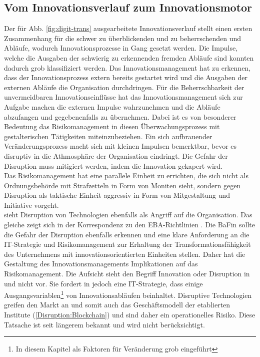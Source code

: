 \subsection{Vom Innovationsverlauf zum Innovationsmotor}
Der für Abb. \ref{fig:digit-trans} ausgearbeitete Innovationsverlauf stellt einen ersten Zusammenhang für die schwer zu überblickenden und zu beherrschenden und Abläufe, wodurch Innovationsprozesse in Gang gesetzt werden. Die Impulse, welche die Ausgaben der schwierig zu erkennenden fremden Abläufe sind konnten dadurch grob klassifiziert werden. Das Innovationsmanagement hat zu erkennen, dass der Innovationsprozess extern bereits gestartet wird und die Ausgaben der externen Abläufe die Organisation durchdringen. Für die Beherrschbarkeit der unvermeidbaren Innovationseinflüsse hat das Innovationsmanagement sich zur Aufgabe machen die externen Impulse wahrzunehmen und die Abläufe abzufangen und gegebenenfalls zu übernehmen.
Dabei ist es von besonderer Bedeutung das Risikomanagement in diesen Überwachungsprozess mit gestalterischen Tätigkeiten miteinzubeziehen. Ein sich aufbrauender Veränderungsprozess macht sich mit kleinen Impulsen bemerktbar, bevor es disruptiv in die Athmosphäre der Organisation eindringt. Die Gefahr der Disruption muss mitigiert werden, indem die Innovation gekapert wird. 
\medskip
\\
Das Risikomanagement hat eine parallele Einheit zu errichten, die sich nicht als Ordnungsbehörde mit Strafzetteln in Form von Moniten sieht, sondern gegen Disruption als taktische Einheit aggressiv in Form von Mitgestaltung und Initiative vorgeht.
\medskip
\\
\citet{Fernandez:2020} sieht Disruption von Technologien ebenfalls als Angriff auf die Organisation. Das gleiche zeigt sich in der Korrespondenz zu den EBA-Richtlinien \cite{eba:2019}. Die \ac{BaFin} sollte die Gefahr der Disruption ebenfalls erkennen und eine klare Anforderung an die IT-Strategie und Risikomanagement zur Erhaltung der Transformationsfähigkeit des Unternehmens mit innovationsorientierten Einheiten stellen.
Daher hat die Gestaltung des Innovationsmanagements Implikationen auf das Risikomanagement. Die Aufsicht sieht den Begriff Innovation oder Disruption in \cite{MaRisk:2017} und \cite{BAIT:2018} nicht vor. Sie fordert in \cite{BAIT:2018} jedoch eine IT-Strategie, dass einige Ausgangsvariablen\footnote{In diesem Kapitel als Faktoren für Veränderung grob eingeführt} von Innovationsabläufen beinhaltet. 
Disruptive Technologien greifen den Markt an \cite{Fernandez:2020} und somit auch das Geschäftsmodell der etablierten Institute (\ref{Disruption:Blockchain}) und sind daher ein operationelles Risiko. Diese Tatsache ist seit längerem bekannt \cite{Ganswindt2006} und wird nicht berücksichtigt.
\medskip
\\

